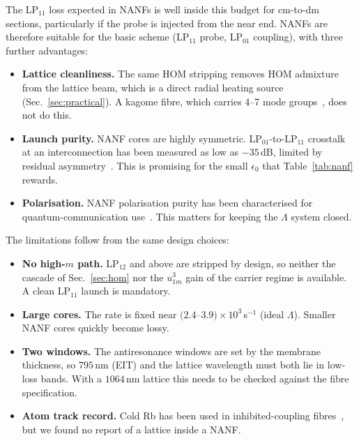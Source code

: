 \documentclass[11pt,a4paper]{article}
\newcommand{\SI}[2]{\ensuremath{#1\,\mathrm{#2}}}
\begin{document}
The LP$_{11}$ loss expected in NANFs is well inside this budget for cm-to-dm sections, particularly if the probe is injected from the near end. NANFs are therefore suitable for the basic scheme (LP$_{11}$ probe, LP$_{01}$ coupling), with three further advantages:
\begin{itemize}
\item \textbf{Lattice cleanliness.} The same HOM stripping removes HOM admixture from the lattice beam, which is a direct radial heating source (Sec.~\ref{sec:practical}). A kagome fibre, which carries 4--7 mode groups~\cite{bradley2016}, does not do this.
\item \textbf{Launch purity.} NANF cores are highly symmetric. LP$_{01}$-to-LP$_{11}$ crosstalk at an interconnection has been measured as low as $-35$\,dB, limited by residual asymmetry~\cite{suslov2021}. This is promising for the small $\epsilon_0$ that Table~\ref{tab:nanf} rewards.
\item \textbf{Polarisation.} NANF polarisation purity has been characterised for quantum-communication use~\cite{afxenti2024}. This matters for keeping the $\Lambda$ system closed.
\end{itemize}
The limitations follow from the same design choices:
\begin{itemize}
\item \textbf{No high-$m$ path.} LP$_{12}$ and above are stripped by design, so neither the cascade of Sec.~\ref{sec:hom} nor the $u_{1m}^3$ gain of the carrier regime is available. A clean LP$_{11}$ launch is mandatory.
\item \textbf{Large cores.} The rate is fixed near $(2.4$--$3.9)\times10^3\,$s$^{-1}$ (ideal $\Lambda$). Smaller NANF cores quickly become lossy.
\item \textbf{Two windows.} The antiresonance windows are set by the membrane thickness, so \SI{795}{nm} (EIT) and the lattice wavelength must both lie in low-loss bands. With a \SI{1064}{nm} lattice this needs to be checked against the fibre specification.
\item \textbf{Atom track record.} Cold Rb has been used in inhibited-coupling fibres~\cite{wang2022}, but we found no report of a lattice inside a NANF.
\end{itemize}
\end{document}
